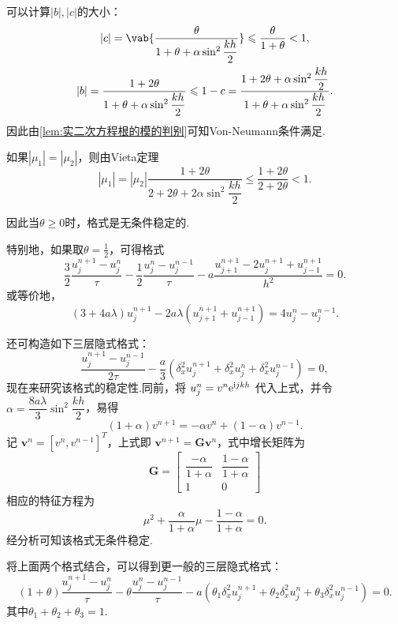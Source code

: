 可以计算$|b|,|c|$的大小：
\begin{gather*}
    |c|=\vab{\frac{\theta}{1+\theta+\alpha\sin^2 \dfrac{kh}{2}}}\leq \frac{\theta}{1+\theta} < 1, \\
    |b|=\frac{1+2\theta}{1+\theta+\alpha\sin^2 \dfrac{kh}{2}}\leq 1-c=\frac{1+2\theta+\alpha\sin^2 \dfrac{kh}{2}}{1+\theta+\alpha\sin^2 \dfrac{kh}{2}}.
\end{gather*}
因此由\cref{lem:实二次方程根的模的判别}可知Von-Neumann条件满足.\par
如果$|\mu_1|=|\mu_2|$，则由Vieta定理
\begin{equation*}
    |\mu_1|=|\mu_2|\frac{1+2\theta}{2+2\theta+2\alpha\sin^2 \dfrac{kh}{2}}\leq \frac{1+2\theta}{2+2\theta} < 1.
\end{equation*}

因此当$\theta\geq 0$时，格式是无条件稳定的.\par

特别地，如果取$\theta=\frac{1}{2}$，可得格式
\begin{equation}\label{eq:4.4}
    \frac{3}{2} \frac{u_j^{n+1} - u_j^n}{\tau} - \frac{1}{2} \frac{u_j^n - u_j^{n-1}}{\tau} - a \frac{u_{j+1}^{n+1} - 2u_j^{n+1} + u_{j-1}^{n+1}}{h^2} = 0.
\end{equation}
或等价地，
\begin{equation*}
    (3 + 4a\lambda) u_j^{n+1} - 2a\lambda(u_{j+1}^{n+1} + u_{j-1}^{n+1}) = 4u_j^n - u_j^{n-1}.
\end{equation*}

    还可构造如下三层隐式格式：
    \begin{equation}\label{eq:4.5}
        \frac{u_j^{n+1} - u_j^{n-1}}{2\tau} - \frac{a}{3} (\delta_x^2 u_j^{n+1} + \delta_x^2 u_j^n + \delta_x^2 u_j^{n-1}) = 0,
    \end{equation}
    现在来研究该格式的稳定性.同前，将 $u_j^n = v^n\mathrm{e}^{\mathrm{i} jkh}$ 代入上式，并令 $\alpha = \dfrac{8a\lambda}{3} \sin^2 \dfrac{kh}{2}$，易得
    \begin{equation*}
        (1 + \alpha)v^{n+1} = -\alpha v^n + (1 - \alpha)v^{n-1}.
    \end{equation*}
    记 $\bm{v}^n = [v^n, v^{n-1}]^T$，上式即 $\bm{v}^{n+1} = \bm{G}\bm{v}^n$，式中增长矩阵为
    \begin{equation*}
        \bm{G} = \begin{bmatrix}
            \dfrac{-\alpha}{1 + \alpha} & \dfrac{1 - \alpha}{1 + \alpha} \\
            1 & 0
        \end{bmatrix}
    \end{equation*}
    相应的特征方程为
    \begin{equation*}
        \mu^2 + \frac{\alpha}{1 + \alpha} \mu - \frac{1 - \alpha}{1 + \alpha} = 0.
    \end{equation*}
经分析可知该格式无条件稳定.\par
将上面两个格式结合，可以得到更一般的三层隐式格式：
\begin{equation*}
    (1+\theta)\frac{u_j^{n+1}-u_j^n}{\tau}-\theta \frac{u_j^n-u_j^{n-1}}{\tau} - a (\theta_1\delta_x^2 u_j^{n+1} + \theta_2\delta_x^2 u_j^n + \theta_3\delta_x^2 u_j^{n-1}) = 0.
\end{equation*}
其中$\theta_1+\theta_2+\theta_3=1$.

